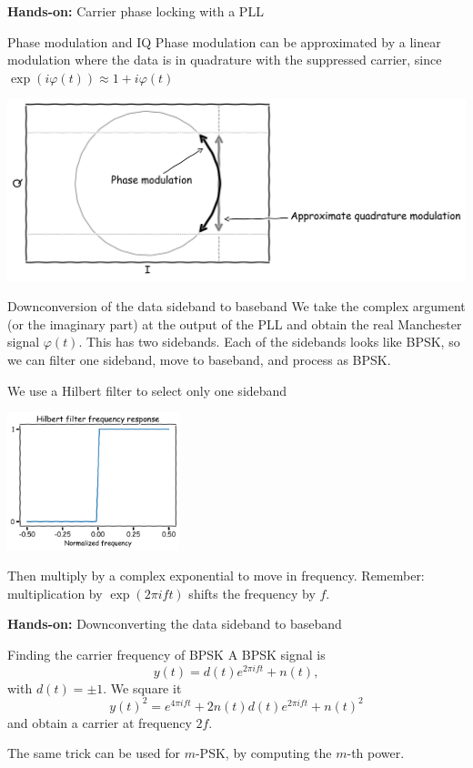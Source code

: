 \documentclass[aspectratio=169]{beamer}
\newcommand{\handson}[1]{\begin{frame}
 \begin{block}{}
   \begin{center}
     \vspace{0.5em}
     {\bf Hands-on:} #1
     \vspace{0.5em}
   \end{center}
 \end{block}
 \end{frame}
}
\begin{document}
\handson{Carrier phase locking with a PLL}

\begin{frame}{Phase modulation and IQ}
  Phase modulation can be approximated by a linear modulation where the data is
  in quadrature with the suppressed carrier, since $\exp(i\varphi(t)) \approx 1
  + i\varphi(t)$

  \begin{center}
    \includegraphics[width=15cm]{iq}
  \end{center}
\end{frame}

\begin{frame}{Downconversion of the data sideband to baseband}
  We take the complex argument (or the imaginary part) at the output of the PLL
  and obtain the real Manchester signal $\varphi(t)$. This has two
  sidebands. Each of the sidebands looks like BPSK, so we can filter one
  sideband, move to baseband, and process as BPSK.

  We use a Hilbert filter to select only one sideband
  \begin{center}
    \includegraphics[width=5cm]{hilbert}
  \end{center}

  Then multiply by a complex exponential to move in frequency. Remember:
  multiplication by $\exp(2\pi i f t)$ shifts the frequency by $f$.
\end{frame}

\handson{Downconverting the data sideband to baseband}

\begin{frame}{Finding the carrier frequency of BPSK}
  A BPSK signal is
  \[
  y(t) = d(t)e^{2\pi i f t} + n(t),
  \]
  with $d(t) = \pm 1$. We square it
  \[
  y(t)^2 = e^{4\pi i f t} + 2 n(t) d(t) e^{2\pi i f t}  + n(t)^2
  \]
  and obtain a carrier at frequency $2 f$.

  \medskip

  The same trick can be used for $m$-PSK, by computing the $m$-th power.
\end{frame}
\end{document}
